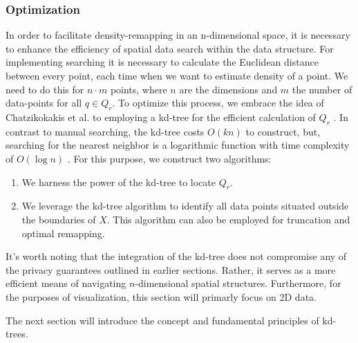 \subsubsection{Optimization}
In order to facilitate density-remapping in an n-dimensional space, it is necessary to enhance the efficiency of spatial data search within the data structure. 
For implementing searching it is necessary to calculate the Euclidean distance between every point, each time when we want to estimate density of a point.
We need to do this for $n \cdot m$ points, where $n$ are the dimensions and $m$ the number of data-points for all $q \in Q_r$.
To optimize this process, we embrace the idea of Chatzikokakis et al. to employing a kd-tree for the efficient calculation of $Q_r$ \citep{chatzikokolakis_efficient_2017}.
In contrast to manual searching, the kd-tree costs $O(kn)$ to construct, but, searching for the nearest neighbor is a logarithmic function with time complexity of $O(\log n)$ \citep{washington_k-d_2002}.
For this purpose, we construct two algorithms:
\begin{enumerate}
    \item We harness the power of the kd-tree to locate $Q_r$.
    \item We leverage the kd-tree algorithm to identify all data points situated outside the boundaries of $X$. This algorithm can also be employed for truncation and optimal remapping.
\end{enumerate} 
It's worth noting that the integration of the kd-tree does not compromise any of the privacy guarantees outlined in earlier sections. 
Rather, it serves as a more efficient means of navigating $n$-dimensional spatial structures. 
Furthermore, for the purposes of visualization, this section will primarly focus on 2D data.

The next section will introduce the concept and fundamental principles of kd-trees. 
\newpage
